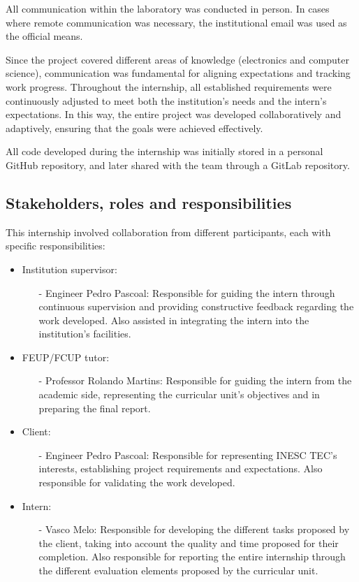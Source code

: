 All communication within the laboratory was conducted in person. In cases where remote communication was necessary, the institutional email was used as the official means.

Since the project covered different areas of knowledge (electronics and computer science), communication was fundamental for aligning expectations and tracking work progress. Throughout the internship, all established requirements were continuously adjusted to meet both the institution’s needs and the intern’s expectations. In this way, the entire project was developed collaboratively and adaptively, ensuring that the goals were achieved effectively.

All code developed during the internship was initially stored in a personal GitHub repository, and later shared with the team through a GitLab repository.

\subsection{Stakeholders, roles and responsibilities}
This internship involved collaboration from different participants, each with specific responsibilities:

\begin{itemize}
    \item Institution supervisor:
    \begin{itemize}
        \item[-] Engineer Pedro Pascoal: Responsible for guiding the intern through continuous supervision and providing constructive feedback regarding the work developed. Also assisted in integrating the intern into the institution's facilities.
    \end{itemize}
    \item FEUP/FCUP tutor:
    \begin{itemize}
        \item[-] Professor Rolando Martins: Responsible for guiding the intern from the academic side, representing the curricular unit's objectives and in preparing the final report.
    \end{itemize}
    \item Client:
    \begin{itemize}
        \item[-] Engineer Pedro Pascoal: Responsible for representing INESC TEC's interests, establishing project requirements and expectations. Also responsible for validating the work developed.
    \end{itemize}
    \item Intern:
    \begin{itemize}
        \item[-] Vasco Melo: Responsible for developing the different tasks proposed by the client, taking into account the quality and time proposed for their completion. Also responsible for reporting the entire internship through the different evaluation elements proposed by the curricular unit.
    \end{itemize}
\end{itemize}

